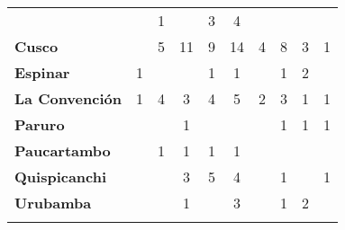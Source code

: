 \begin{tabular}{lccccccccc}
	&\cellcolor[HTML]{FCC46C} 					&1
	&\cellcolor[HTML]{FCC46C}					&3
	&4											&\cellcolor[HTML]{FCC46C}
	&\cellcolor[HTML]{FCC46C}\\
	\textbf{Cusco}                            						
	&\cellcolor[HTML]{FCC46C}					
	&5
	&11											&9 	
	&14 										&4
	&8											&3
	&1\\
	\textbf{Espinar}       					             									
	&1
	&\cellcolor[HTML]{FCC46C} 					&\cellcolor[HTML]{FCC46C}
	&1											&1
	&\cellcolor[HTML]{FCC46C}					&1
	&2											&\cellcolor[HTML]{FCC46C}	\\
	\textbf{La Convención}                      		
	&1 					
	&4 											&3
	&4											&5
	&2											&3
	&1 											&1 \\
	\textbf{Paruro}                            
    &\cellcolor[HTML]{FCC46C}		 			&\cellcolor[HTML]{FCC46C}					
	&1
	&\cellcolor[HTML]{FCC46C}					&\cellcolor[HTML]{FCC46C}
	&\cellcolor[HTML]{FCC46C} 					&1
	&1											&1\\
	\textbf{Paucartambo}               		                       					
	&\cellcolor[HTML]{FCC46C} 					&1
	&1											&1		
	&1											&\cellcolor[HTML]{FCC46C}
	&\cellcolor[HTML]{FCC46C}
	&\cellcolor[HTML]{FCC46C}					&\cellcolor[HTML]{FCC46C}\\
	\textbf{Quispicanchi}                                         	                  		 
	&\cellcolor[HTML]{FCC46C}					&\cellcolor[HTML]{FCC46C}
	&3											&5
	&4											&\cellcolor[HTML]{FCC46C}
	&1											&\cellcolor[HTML]{FCC46C}
	&1\\
	\textbf{Urubamba}                                                          		
						&\cellcolor[HTML]{FCC46C}
	&\cellcolor[HTML]{FCC46C}					&1
	&\cellcolor[HTML]{FCC46C}					&3
	&\cellcolor[HTML]{FCC46C}					&1
	&2			&\cellcolor[HTML]{FCC46C}\\	
	&\multicolumn{1}{l}{}                       &\multicolumn{1}{l}{}            &\multicolumn{1}{l}{}                         
	&\multicolumn{1}{l}{}                       &\multicolumn{1}{l}{}            &\multicolumn{1}{l}{}                       &\multicolumn{1}{l}{}                       &\multicolumn{1}{l}{}            &\multicolumn{1}{l}{}    
\end{tabular}